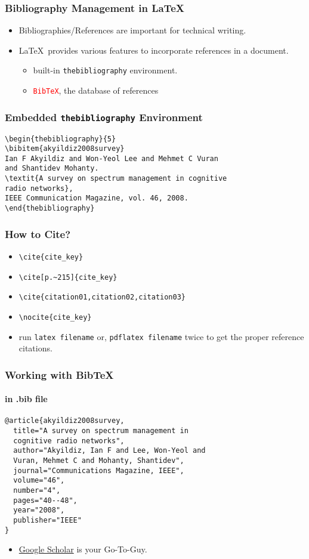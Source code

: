 \documentclass{beamer}
\begin{document}
\begin{frame}
\frametitle{Bibliography Management in \LaTeX}
\begin{itemize}
    \item Bibliographies/References are important for technical writing.
    \item \LaTeX\ provides various features to incorporate references in a document.
    \begin{itemize}
        \item built-in \textcolor{green!50!black}{\texttt{thebibliography}} environment.
        \item \textcolor{red}{\texttt{BibTeX}}, the database of references
    \end{itemize}
\end{itemize}
\end{frame}
\begin{frame}[fragile]
\frametitle{Embedded \textcolor{green!50!black}{\texttt{thebibliography}} Environment}
\begin{lstlisting}
\begin{thebibliography}{5}
\bibitem{akyildiz2008survey}
Ian F Akyildiz and Won-Yeol Lee and Mehmet C Vuran
and Shantidev Mohanty.
\textit{A survey on spectrum management in cognitive
radio networks},
IEEE Communication Magazine, vol. 46, 2008.
\end{thebibliography}
\end{lstlisting}
\end{frame}
\begin{frame}[fragile]
\frametitle{How to Cite?}
\begin{itemize}
    \item \verb|\cite{cite_key}|
    \item \verb|\cite[p.~215]{cite_key}|
    \item \verb|\cite{citation01,citation02,citation03}|
    \item \verb|\nocite{cite_key}|
    \item run \texttt{latex filename} or, \texttt{pdflatex filename} twice to get the proper reference citations.
\end{itemize}
\end{frame}
\begin{frame}[fragile]
\frametitle{Working with BibTeX}
\framesubtitle{in .bib file}
\begin{lstlisting}
@article{akyildiz2008survey,
  title="A survey on spectrum management in
  cognitive radio networks",
  author="Akyildiz, Ian F and Lee, Won-Yeol and
  Vuran, Mehmet C and Mohanty, Shantidev",
  journal="Communications Magazine, IEEE",
  volume="46",
  number="4",
  pages="40--48",
  year="2008",
  publisher="IEEE"
}
\end{lstlisting}
\pause
\begin{itemize}
    \item \href{http://scholar.google.com}{Google Scholar} is your Go-To-Guy.
\end{itemize}
\end{frame}
\end{document}
